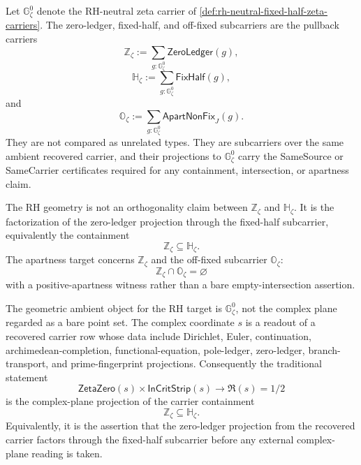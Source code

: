 \begin{definition}
\label{def:rh-zero-fixed-offfixed-subcarriers}
Let $\mathbb G_{\zeta}^{0}$ denote the RH-neutral zeta carrier of
\autoref{def:rh-neutral-fixed-half-zeta-carriers}. The zero-ledger,
fixed-half, and off-fixed subcarriers are the pullback carriers
$$
\mathbb Z_{\zeta}
:=
\sum_{g:\mathbb G_{\zeta}^{0}}\mathsf{ZeroLedger}(g),
$$
$$
\mathbb H_{\zeta}
:=
\sum_{g:\mathbb G_{\zeta}^{0}}\mathsf{FixHalf}(g),
$$
and
$$
\mathbb O_{\zeta}
:=
\sum_{g:\mathbb G_{\zeta}^{0}}\mathsf{ApartNonFix}_{J}(g).
$$
They are not compared as unrelated types. They are subcarriers over the
same ambient recovered carrier, and their projections to
$\mathbb G_{\zeta}^{0}$ carry the SameSource or SameCarrier certificates
required for any containment, intersection, or apartness claim.
\end{definition}

\begin{principle}
\label{prin:rh-zero-fixed-containment-not-orthogonality}
The RH geometry is not an orthogonality claim between
$\mathbb Z_{\zeta}$ and $\mathbb H_{\zeta}$. It is the factorization of
the zero-ledger projection through the fixed-half subcarrier,
equivalently the containment
$$
\mathbb Z_{\zeta}\subseteq\mathbb H_{\zeta}.
$$
The apartness target concerns $\mathbb Z_{\zeta}$ and the off-fixed
subcarrier $\mathbb O_{\zeta}$:
$$
\mathbb Z_{\zeta}\cap\mathbb O_{\zeta}=\varnothing
$$
with a positive-apartness witness rather than a bare empty-intersection
assertion.
\end{principle}

\begin{principle}
\label{prin:rh-recovered-carrier-not-point-set-geometry}
The geometric ambient object for the RH target is
$\mathbb G_{\zeta}^{0}$, not the complex plane regarded as a bare point
set.  The complex coordinate $s$ is a readout of a recovered carrier row
whose data include Dirichlet, Euler, continuation, archimedean-completion,
functional-equation, pole-ledger, zero-ledger, branch-transport, and
prime-fingerprint projections.  Consequently the traditional statement
$$
\mathsf{ZetaZero}(s)\times\mathsf{InCritStrip}(s)
\to
\Re(s)=1/2
$$
is the complex-plane projection of the carrier containment
$$
\mathbb Z_{\zeta}\subseteq\mathbb H_{\zeta}.
$$
Equivalently, it is the assertion that the zero-ledger projection from the
recovered carrier factors through the fixed-half subcarrier before any
external complex-plane reading is taken.
\end{principle}

